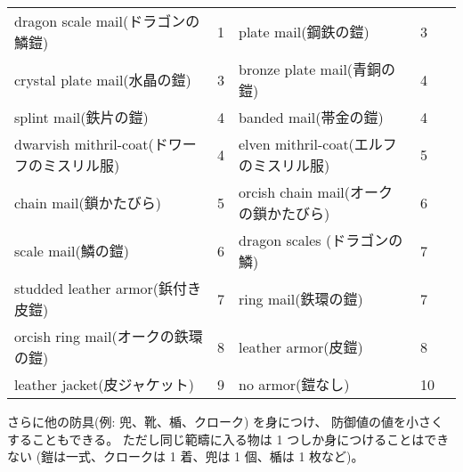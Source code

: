 \begin{center}
\begin{tabular}{lllll}
dragon scale mail(ドラゴンの鱗鎧)  & 1 & plate mail(鋼鉄の鎧)         & 3\\
crystal plate mail(水晶の鎧)       & 3 & bronze plate mail(青銅の鎧)  & 4\\
splint mail(鉄片の鎧)              & 4 & banded mail(帯金の鎧)        & 4\\
dwarvish mithril-coat(ドワーフのミスリル服) & 4 & elven mithril-coat(エルフのミスリル服) & 5\\
chain mail(鎖かたびら)             & 5 & orcish chain mail(オークの鎖かたびら) & 6\\
scale mail(鱗の鎧)                 & 6 & dragon scales (ドラゴンの鱗) & 7\\
studded leather armor(鋲付き皮鎧)  & 7 & ring mail(鉄環の鎧)          & 7\\
orcish ring mail(オークの鉄環の鎧) & 8 & leather armor(皮鎧)          & 8\\
leather jacket(皮ジャケット)       & 9 & no armor(鎧なし)             & 10\\
\end{tabular}
\end{center}

\nd さらに他の防具(例: 兜、靴、楯、クローク) を身につけ、
防御値の値を小さくすることもできる。
ただし同じ範疇に入る物は 1 つしか身につけることはできない
(鎧は一式、クロークは 1 着、兜は 1 個、楯は 1 枚など)。

